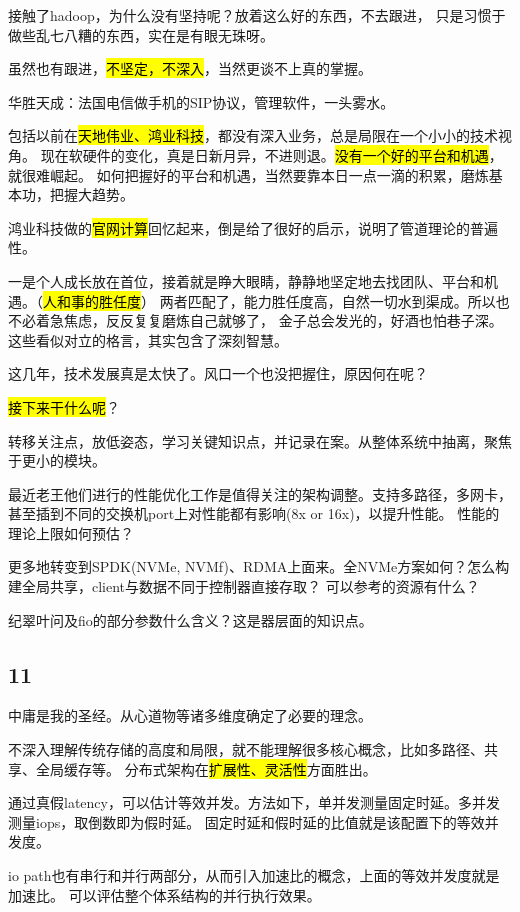 接触了hadoop，为什么没有坚持呢？放着这么好的东西，不去跟进，
只是习惯于做些乱七八糟的东西，实在是有眼无珠呀。

虽然也有跟进，\hl{不坚定，不深入}，当然更谈不上真的掌握。

\hrulefill

华胜天成：法国电信做手机的SIP协议，管理软件，一头雾水。

包括以前在\hl{天地伟业、鸿业科技}，都没有深入业务，总是局限在一个小小的技术视角。
现在软硬件的变化，真是日新月异，不进则退。\hl{没有一个好的平台和机遇}，就很难崛起。
如何把握好的平台和机遇，当然要靠本日一点一滴的积累，磨炼基本功，把握大趋势。

鸿业科技做的\hl{官网计算}回忆起来，倒是给了很好的启示，说明了管道理论的普遍性。

一是个人成长放在首位，接着就是睁大眼睛，静静地坚定地去找团队、平台和机遇。（\hl{人和事的胜任度}）
两者匹配了，能力胜任度高，自然一切水到渠成。所以也不必着急焦虑，反反复复磨炼自己就够了，
金子总会发光的，好酒也怕巷子深。这些看似对立的格言，其实包含了深刻智慧。

这几年，技术发展真是太快了。风口一个也没把握住，原因何在呢？

\hl{接下来干什么呢}？

转移关注点，放低姿态，学习关键知识点，并记录在案。从整体系统中抽离，聚焦于更小的模块。

最近老王他们进行的性能优化工作是值得关注的架构调整。支持多路径，多网卡，甚至插到不同的交换机port上对性能都有影响(8x or 16x)，以提升性能。
性能的理论上限如何预估？

更多地转变到SPDK(NVMe, NVMf)、RDMA上面来。全NVMe方案如何？怎么构建全局共享，client与数据不同于控制器直接存取？
可以参考的资源有什么？

纪翠叶问及fio的部分参数什么含义？这是器层面的知识点。

\subsection{11}

中庸是我的圣经。从心道物等诸多维度确定了必要的理念。

\hrulefill

不深入理解传统存储的高度和局限，就不能理解很多核心概念，比如多路径、共享、全局缓存等。
分布式架构在\hl{扩展性、灵活性}方面胜出。

通过真假latency，可以估计等效并发。方法如下，单并发测量固定时延。多并发测量iops，取倒数即为假时延。
固定时延和假时延的比值就是该配置下的等效并发度。

io path也有串行和并行两部分，从而引入加速比的概念，上面的等效并发度就是加速比。
可以评估整个体系结构的并行执行效果。

